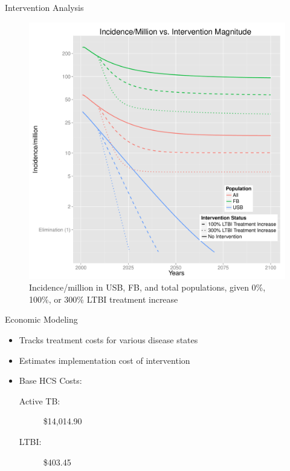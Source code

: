 \documentclass[final]{beamer}
\begin{document}
\begin{frame}
\begin{columns}[T]
\begin{column}{.3\textwidth}
\begin{block}{Intervention Analysis}
\begin{figure}[h]
\begin{minipage}[c]{0.6\textwidth}
            \includegraphics[height=.5\textwidth,width=\textwidth]{incLTBItrmtIncGrouped}
          \end{minipage}
          \hspace{0.5em}
          \begin{minipage}[c]{0.35\textwidth}
            \caption{Incidence/million in USB, FB, and total populations,
                     given 0\%, 100\%, or 300\% LTBI treatment increase}
          \end{minipage}
          \label{fig:incLTBItrmt_incidence}
        \end{figure}
      \end{block}
      \begin{block}{Economic Modeling}
        \begin{itemize}
          \item Tracks treatment costs for various disease states
          \item Estimates implementation cost of intervention
          \item Base HCS Costs:
            \begin{description}
              \item[Active TB:]\hfill 
                \$14,014.90
              \item[LTBI:]\hfill 
                \$403.45
            \end{description}
        \end{itemize}
        \begin{columns}[T]
          \begin{column}{.66\textwidth}
            \begin{figure}[h]
              \begin{center}

\end{center}
\end{figure}
\end{column}
\end{columns}
\end{block}
\end{column}
\end{columns}
\end{frame}
\end{document}
